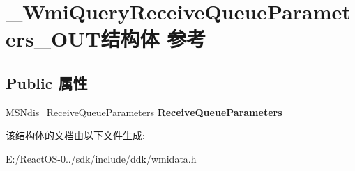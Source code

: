 \hypertarget{struct___wmi_query_receive_queue_parameters___o_u_t}{}\section{\+\_\+\+Wmi\+Query\+Receive\+Queue\+Parameters\+\_\+\+O\+U\+T结构体 参考}
\label{struct___wmi_query_receive_queue_parameters___o_u_t}
\subsection*{Public 属性}
\begin{DoxyCompactItemize}
\item 
\mbox{\label{struct___wmi_query_receive_queue_parameters___o_u_t_a498ef6ca50c17712b81d958ea189a9d0}} 
\hyperlink{struct___m_s_ndis___receive_queue_parameters}{M\+S\+Ndis\+\_\+\+Receive\+Queue\+Parameters} {\bfseries Receive\+Queue\+Parameters}
\end{DoxyCompactItemize}


该结构体的文档由以下文件生成\+:\begin{DoxyCompactItemize}
\item 
E\+:/\+React\+O\+S-\/0../sdk/include/ddk/wmidata.\+h\end{DoxyCompactItemize}
